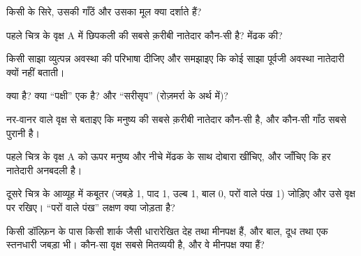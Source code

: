 \begin{exercise}[$\star$]\label{exo:g12:phylogenetic-trees:1}
किसी  के सिरे, उसकी गाँठें और उसका मूल क्या दर्शाते हैं?
\end{exercise}

\begin{exercise}[$\star$]\label{exo:g12:phylogenetic-trees:2}
पहले चित्र के वृक्ष A में छिपकली की सबसे क़रीबी नातेदार कौन-सी  है?
मेंढक की?
\end{exercise}

\begin{exercise}[$\star$]\label{exo:g12:phylogenetic-trees:3}
किसी साझा व्युत्पन्न अवस्था की परिभाषा दीजिए और समझाइए कि कोई साझा पूर्वजी
अवस्था नातेदारी क्यों नहीं बताती।
\end{exercise}

\begin{exercise}[$\star$]\label{exo:g12:phylogenetic-trees:4}
 क्या है? क्या ``पक्षी'' एक  है? और ``सरीसृप'' (रोज़मर्रा के
अर्थ में)?
\end{exercise}

\begin{exercise}[$\star$]\label{exo:g12:phylogenetic-trees:5}
नर-वानर वाले वृक्ष से बताइए कि मनुष्य की सबसे क़रीबी नातेदार कौन-सी है, और
कौन-सी गाँठ सबसे पुरानी है।
\end{exercise}

\begin{exercise}[$\star\star$]\label{exo:g12:phylogenetic-trees:6}
पहले चित्र के वृक्ष A को ऊपर मनुष्य और नीचे मेंढक के साथ दोबारा खींचिए, और
जाँचिए कि हर नातेदारी अनबदली है।
\end{exercise}

\begin{exercise}[$\star\star$]\label{exo:g12:phylogenetic-trees:7}
दूसरे चित्र के आव्यूह में कबूतर (जबड़े 1, पाद 1, उल्ब 1, बाल 0, परों वाले
पंख 1) जोड़िए और उसे वृक्ष पर रखिए। ``परों वाले पंख'' लक्षण क्या जोड़ता है?
\end{exercise}

\begin{exercise}[$\star\star$]\label{exo:g12:phylogenetic-trees:8}
किसी डॉल्फ़िन के पास किसी शार्क जैसी धारारेखित देह तथा मीनपक्ष हैं, और बाल,
दूध तथा एक स्तनधारी जबड़ा भी। कौन-सा वृक्ष सबसे मितव्ययी है, और वे मीनपक्ष
क्या हैं?
\end{exercise}

